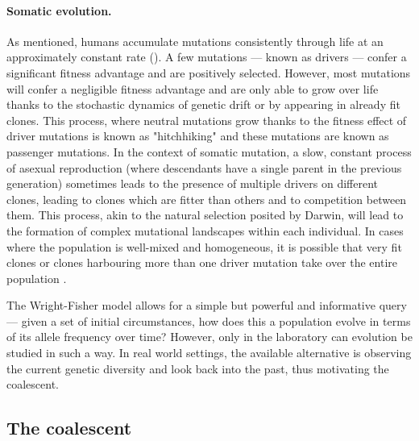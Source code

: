 \paragraph{Somatic evolution.} As mentioned, humans accumulate mutations consistently through life at an approximately constant rate (\cite{Abascal_2021_gjvqfm,Mitchell2021-zl}). A few mutations --- known as drivers --- confer a significant fitness advantage and are positively selected. However, most mutations will confer a negligible fitness advantage and are only able to grow over life thanks to the stochastic dynamics of genetic drift or by appearing in already fit clones. This process, where neutral mutations grow thanks to the fitness effect of driver mutations is known as "hitchhiking" and these mutations are known as passenger mutations. In the context of somatic mutation, a slow, constant process of asexual reproduction (where descendants have a single parent in the previous generation) sometimes leads to the presence of multiple drivers on different clones, leading to clones which are fitter than others and to competition between them. This process, akin to the natural selection posited by Darwin, will lead to the formation of complex mutational landscapes within each individual. In cases where the population is well-mixed and homogeneous, it is possible that very fit clones or clones harbouring more than one driver mutation take over the entire population \cite{Beerenwinkel2015-xr,Grossmann2020-ka}.

The Wright-Fisher model allows for a simple but powerful and informative query --- given a set of initial circumstances, how does this a population evolve in terms of its allele frequency over time? However, only in the laboratory can evolution be studied in such a way. In real world settings, the available alternative is observing the current genetic diversity and look back into the past, thus motivating the coalescent.

\subsection{The coalescent}

